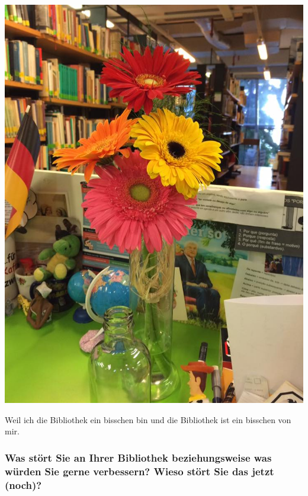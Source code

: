 \begin{center}
\includegraphics{gi-porto-alegre/img/meu-canto.jpg}
\end{center}

Weil ich die Bibliothek ein bisschen bin und die Bibliothek ist ein
bisschen von mir.

\hypertarget{was-stuxf6rt-sie-an-ihrer-bibliothek-beziehungsweise-was-wuxfcrden-sie-gerne-verbessern-wieso-stuxf6rt-sie-das-jetzt-noch}{%
\subsubsection*{Was stört Sie an Ihrer Bibliothek beziehungsweise was würden
Sie gerne verbessern? Wieso stört Sie das jetzt
(noch)?}\label{was-stuxf6rt-sie-an-ihrer-bibliothek-beziehungsweise-was-wuxfcrden-sie-gerne-verbessern-wieso-stuxf6rt-sie-das-jetzt-noch}}

